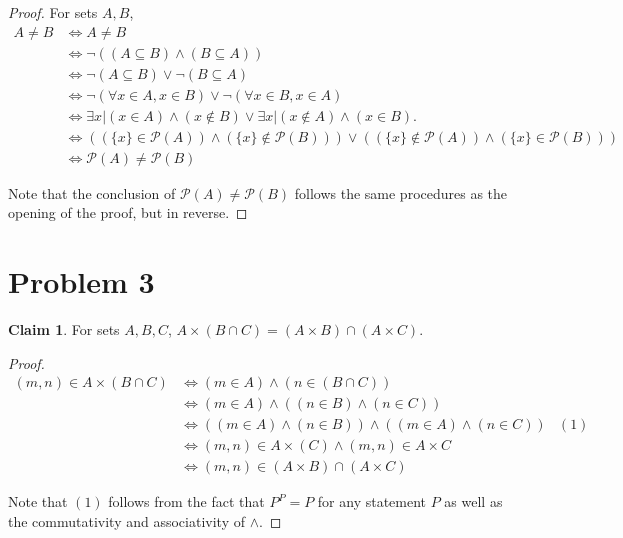 \documentclass[12pt,letterpaper]{article}
\theoremstyle{definition}
\newtheorem*{claim}{Claim}
\begin{document}
\begin{proof}
    For sets $A, B$,
    \begin{align*}
        A \neq B &\iff A \neq B \\
        &\iff \neg ((A \subseteq B) \land (B \subseteq A)) \\
        &\iff \neg(A \subseteq B) \lor \neg(B \subseteq A) \\
        &\iff \neg(\forall x \in A, x \in B) \lor \neg(\forall x \in B, x\in A) \\
        &\iff \exists x | (x \in A) \land (x \notin B) \lor \exists x | (x \notin A) \land (x \in B). \\
        &\iff ((\{x\} \in \mathcal{P}(A)) \land (\{x\} \notin \mathcal{P}(B))) \lor ((\{x\} \notin \mathcal{P}(A)) \land (\{x\} \in \mathcal{P}(B)))\\
        &\iff \mathcal{P}(A) \neq \mathcal{P}(B)
    \end{align*}
    
    Note that the conclusion of $\mathcal{P}(A) \neq \mathcal{P}(B)$ follows the same procedures as the opening of the proof, but in reverse.
\end{proof}

\section*{Problem 3}
\begin{claim}
    For sets $A, B, C$, $A \times (B \cap C) = (A \times B) \cap (A \times C)$.
\end{claim}

\begin{proof}
    \begin{align*}
        (m,n) \in A \times (B \cap C) &\iff (m \in A) \land (n \in (B \cap C)) \\
        &\iff (m \in A) \land ((n \in B) \land (n \in C)) \\
        &\iff ((m \in A) \land (n \in B)) \land ((m \in A) \land (n \in C)) &(1)\\
        &\iff (m,n) \in A \times (C) \land (m,n) \in A \times C \\
        &\iff (m,n) \in (A \times B) \cap (A \times C)
    \end{align*}
    
    Note that $(1)$ follows from the fact that $P ^ P = P$ for any statement $P$ as well as the commutativity and associativity of $\land$.
\end{proof}
\end{document}
